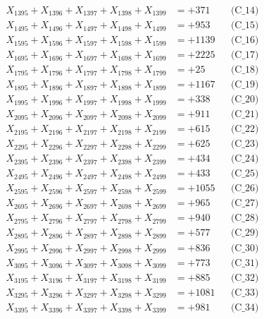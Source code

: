 \documentclass[a4paper,10pt]{article}
\begin{document}
{\begin{align}
X_{1395} + X_{1396} + X_{1397} + X_{1398} + X_{1399} &= +371 && \text{(C\_14)} \\
X_{1495} + X_{1496} + X_{1497} + X_{1498} + X_{1499} &= +953 && \text{(C\_15)} \\
\allowbreak
X_{1595} + X_{1596} + X_{1597} + X_{1598} + X_{1599} &= +1139 && \text{(C\_16)} \\
X_{1695} + X_{1696} + X_{1697} + X_{1698} + X_{1699} &= +2225 && \text{(C\_17)} \\
X_{1795} + X_{1796} + X_{1797} + X_{1798} + X_{1799} &= +25 && \text{(C\_18)} \\
X_{1895} + X_{1896} + X_{1897} + X_{1898} + X_{1899} &= +1167 && \text{(C\_19)} \\
X_{1995} + X_{1996} + X_{1997} + X_{1998} + X_{1999} &= +338 && \text{(C\_20)} \\
\allowbreak
X_{2095} + X_{2096} + X_{2097} + X_{2098} + X_{2099} &= +911 && \text{(C\_21)} \\
X_{2195} + X_{2196} + X_{2197} + X_{2198} + X_{2199} &= +615 && \text{(C\_22)} \\
X_{2295} + X_{2296} + X_{2297} + X_{2298} + X_{2299} &= +625 && \text{(C\_23)} \\
X_{2395} + X_{2396} + X_{2397} + X_{2398} + X_{2399} &= +434 && \text{(C\_24)} \\
X_{2495} + X_{2496} + X_{2497} + X_{2498} + X_{2499} &= +433 && \text{(C\_25)} \\
\allowbreak
X_{2595} + X_{2596} + X_{2597} + X_{2598} + X_{2599} &= +1055 && \text{(C\_26)} \\
X_{2695} + X_{2696} + X_{2697} + X_{2698} + X_{2699} &= +965 && \text{(C\_27)} \\
X_{2795} + X_{2796} + X_{2797} + X_{2798} + X_{2799} &= +940 && \text{(C\_28)} \\
X_{2895} + X_{2896} + X_{2897} + X_{2898} + X_{2899} &= +577 && \text{(C\_29)} \\
X_{2995} + X_{2996} + X_{2997} + X_{2998} + X_{2999} &= +836 && \text{(C\_30)} \\
\allowbreak
X_{3095} + X_{3096} + X_{3097} + X_{3098} + X_{3099} &= +773 && \text{(C\_31)} \\
X_{3195} + X_{3196} + X_{3197} + X_{3198} + X_{3199} &= +885 && \text{(C\_32)} \\
X_{3295} + X_{3296} + X_{3297} + X_{3298} + X_{3299} &= +1081 && \text{(C\_33)} \\
X_{3395} + X_{3396} + X_{3397} + X_{3398} + X_{3399} &= +981 && \text{(C\_34)} \\

\end{align}}
\end{document}
